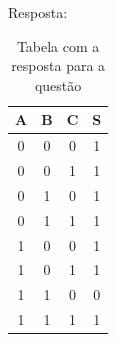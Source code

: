 \documentclass[12pt]{article}
\begin{document}
Resposta:

\begin{table}[H]
    \centering
    \caption{Tabela com a resposta para a questão}
    \begin{tabular}{|c|c|c|c|} \hline
    \textbf{A} & \textbf{B} & \textbf{C} & \textbf{S} \\ \hline
    0 & 0 & 0 & 1 \\ \hline
    0 & 0 & 1 & 1 \\ \hline
    0 & 1 & 0 & 1 \\ \hline
    0 & 1 & 1 & 1 \\ \hline
    1 & 0 & 0 & 1 \\ \hline
    1 & 0 & 1 & 1 \\ \hline
    1 & 1 & 0 & 0 \\ \hline
    1 & 1 & 1 & 1 \\ \hline
    \end{tabular}
    \label{tab:tabela_verdade}
\end{table}
\end{document}
